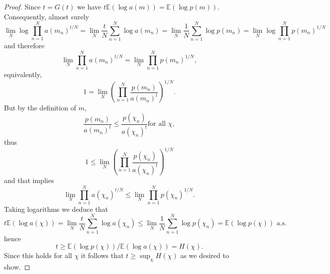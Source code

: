 \documentclass{amsart}
\theoremstyle{plain}
\numberwithin{equation}{section}
\newcommand{\ee}{{\mathbb E}}
\begin{document}
\begin{proof}
Since $t=G(t)$ we have $t\ee(\log a(m))=\ee(\log p(m))$.
Consequently, almost surely
\begin{equation*}
    \lim_{N}\log \prod_{n=1}^{N}a(m_{n})^{t/N}
  = \lim_{N}\frac{t}{N}\sum_{n=1}^{N}\log a(m_{n})
  =\lim_{N}\frac{1}{N}\sum_{n=1}^{N}\log p(m_{n})
  =\lim_{N}\log \prod_{n=1}^{N}p(m_{n})^{1/N}
\end{equation*}
and therefore 
\begin{equation*}
     \lim_{N}\prod_{n=1}^{N}a(m_{n})^{t/N}=\lim_{N}\prod_{n=1}^{N}p(m_{n})^{1/N},
\end{equation*}
equivalently,  
\begin{equation*}
      1=\lim_{N}\left( \prod_{n=1}^{N}\frac{p(m_{n})}{a(m_{n})^{t}}\right) ^{1/N}.
\end{equation*}
But by the definition of $m$, 
\begin{equation*}
     \frac{p(m_{n})}{a(m_{n})^{t}}\leq \frac{p(\chi _{n})}{a(\chi _{n})^{t}}\text{for all }\chi ,
\end{equation*}
thus
\begin{equation*}
   1\leq \lim_{N}\left( \prod_{n=1}^{N}\frac{p(\chi _{n})}{a(\chi _{n})^{t}}\right) ^{1/N}
\end{equation*}
and that implies
\begin{equation*}
   \lim_{N}\prod_{n=1}^{N}a(\chi _{n})^{t/N}\leq 
           \lim_{N}\prod_{n=1}^{N}p(\chi_{n})^{1/N}.
\end{equation*}
Taking logarithms we deduce that
\begin{equation*}
   t \ee(\log a(\chi ))=\lim_{N}\frac{t}{N}\sum_{n=1}^{N}\log a(\chi_{n})
     \leq \lim_{N}\frac{1}{N}\sum_{n=1}^{N}\log p(\chi _{n})=\ee(\log p(\chi ))\text{ a.s.}
\end{equation*}
hence  
\begin{equation*}
    t\geq \ee(\log p(\chi ))/\ee(\log a(\chi ))=H(\chi ).
\end{equation*}
Since this holds for all $\chi $ it follows that $t\geq \sup_{\chi }H(\chi )$
as we desired to show.

\medskip 


\end{proof}
\end{document}
